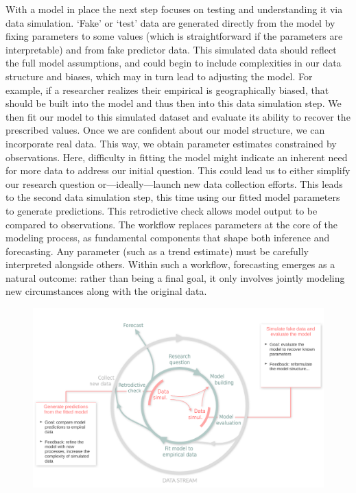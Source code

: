 \documentclass[11pt]{article}
\begin{document}
With a model in place the next step focuses on testing and understanding it via data simulation. `Fake' or `test' data are generated directly from the model by fixing parameters to some values (which is straightforward if the parameters are interpretable) and from fake predictor data. This simulated data should reflect the full model assumptions, and could begin to include complexities in our data structure and biases, which may in turn lead to adjusting the model. For example, if a researcher realizes their empirical is geographically biased, that should be built into the model and thus then into this data simulation step. 
We then fit our model to this simulated dataset and evaluate its ability to recover the prescribed values. 
Once we are confident about our model structure, we can incorporate real data. This way, we obtain parameter estimates constrained by observations. Here, difficulty in fitting the model might indicate an inherent need for more data to address our initial question. This could lead us to either simplify our research question or---ideally---launch new data collection efforts. This leads to the second data simulation step, this time using our fitted model parameters to generate predictions. This retrodictive check allows model output to be compared to observations. 
The workflow replaces parameters at the core of the modeling process, as fundamental components that shape both inference and forecasting. Any parameter (such as a trend estimate) must be carefully interpreted alongside others. %
Within such a workflow, forecasting emerges as a natural outcome: rather than being a final goal, it only involves jointly modeling new circumstances along with the original data.

\begin{figure}[h]
	\centering
    \hspace*{-1.5cm}
	\includegraphics{figures/figure_worflow}
	\caption{} 
	\label{fig:modeldata}
\end{figure}
\end{document}
